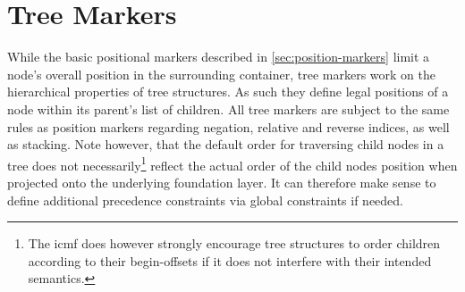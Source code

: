 \documentclass[11pt,a4paper]{report}
\begin{document}
\section{Tree Markers}
\label{sec:tree-markers}

While the basic positional markers described in \cref{sec:position-markers} limit a node's overall position in the surrounding container, tree markers work on the hierarchical properties of tree structures.
As such they define legal positions of a node within its parent's list of children.
All tree markers are subject to the same rules as position markers regarding negation, relative and reverse indices, as well as stacking.
Note however, that the default order for traversing child nodes in a tree does not necessarily\footnote{The \ac{icmf} does however strongly encourage tree structures to order children according to their begin-offsets if it does not interfere with their intended semantics.} reflect the actual order of the child nodes position when projected onto the underlying foundation layer.
It can therefore make sense to define additional precedence constraints via global constraints if needed.
\end{document}
